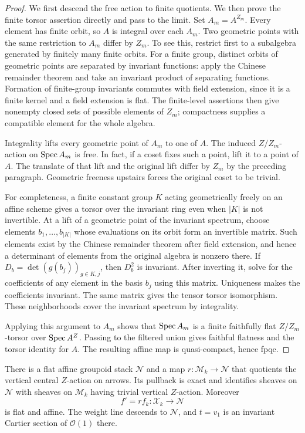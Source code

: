 \begin{proof}
We first descend the free action to finite quotients.  We then prove
the finite torsor assertion directly and pass to the limit.
Set $A_m=A^{Z_m}$.  Every element has finite orbit, so $A$ is
integral over each $A_m$.  Two geometric points with the same
restriction to $A_m$ differ by $Z_m$.  To see this, restrict first
to a subalgebra generated by finitely many finite orbits.  For a finite
group, distinct orbits of geometric points are separated by invariant
functions: apply the Chinese remainder theorem and take an invariant
product of separating functions.  Formation of finite-group
invariants commutes with field extension, since it is a finite
kernel and a field extension is flat.  The finite-level assertions
then give nonempty closed sets of possible elements of $Z_m$;
compactness supplies a compatible element for the whole algebra.

Integrality lifts every geometric point of $A_m$ to one of $A$.
The induced $Z/Z_m$-action on $\operatorname{Spec} A_m$ is free.  In fact, if a
coset fixes such a point, lift it to a point of $A$.  The translate
of that lift and the original lift differ by $Z_m$ by the preceding
paragraph.  Geometric freeness upstairs forces the original coset
to be trivial.

For completeness, a finite constant group $K$ acting geometrically
freely on an affine scheme gives a torsor over the invariant ring
even when $|K|$ is not invertible.  At a lift of a geometric point
of the invariant spectrum, choose elements $b_1,\ldots,b_{|K|}$
whose evaluations on its orbit form an invertible matrix.  Such
elements exist by the Chinese remainder theorem after field extension,
and hence a determinant of elements from the original algebra is
nonzero there.  If
$D_b=\det(g(b_j))_{g\in K,j}$, then $D_b^2$ is invariant.
After inverting it, solve for the coefficients of any element in
the basis $b_j$ using this matrix.  Uniqueness makes the coefficients
invariant.  The same matrix gives the tensor torsor isomorphism.
These neighborhoods cover the invariant spectrum by integrality.

Applying this argument to $A_m$ shows that $\operatorname{Spec} A_m$ is a finite
faithfully flat $Z/Z_m$-torsor over $\operatorname{Spec} A^Z$.  Passing to the
filtered union gives faithful flatness and the torsor identity for
$A$.  The resulting affine map is quasi-compact, hence fpqc.
\end{proof}

\begin{proposition}\label{geom:rigidification}
There is a flat affine groupoid stack $\mathcal N$ and a map
$r:\mathcal M_k\to\mathcal N$ that quotients the vertical central
$Z$-action on arrows.  Its pullback is exact and identifies sheaves
on $\mathcal N$ with sheaves on $\mathcal M_k$ having trivial vertical
$Z$-action.  Moreover
\[
 f'=rf_k:\mathcal X_k\longrightarrow\mathcal N
\]
is flat and affine.  The weight line descends to $\mathcal N$, and
$t=v_1$ is an invariant Cartier section of $\mathcal O(1)$ there.
\end{proposition}

